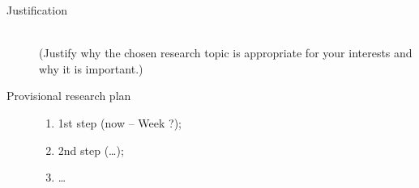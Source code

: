 \documentclass[runningheads]{llncs}
\begin{document}
\begin{description}
  \item[Justification]\mbox{}\\
   (Justify why the chosen research topic is appropriate for your interests and why it is important.)\\
\end{description}
\begin{description}
  \item[Provisional research plan]\mbox{}
     \begin{enumerate}
       \item 1st step (now -- Week ?);
       \item 2nd step (\dots);
       \item \dots
     \end{enumerate}
\end{description}
%
\end{document}
